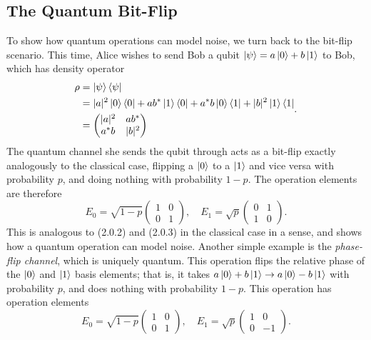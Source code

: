 \documentclass[12pt,a4paper]{report}
\numberwithin{equation}{section}
\newcommand{\ketbra}[2]{\ket{#1}\bra{#2}}
\newcommand{\ketbras}[1]{\ketbra{#1}{#1}}
\theoremstyle{definition}
\theoremstyle{theorem}
\theoremstyle{theorem}
\theoremstyle{example}
\theoremstyle{definition}
\begin{document}
\subsection{The Quantum Bit-Flip}
To show how quantum operations can model noise, we turn back to the bit-flip scenario. This time, Alice wishes to send Bob a qubit $\ket{\psi}=a\ket{0}+b\ket{1}$ to Bob, which has density operator
\begin{equation}
	\begin{aligned} 
		\rho&=\ketbras{\psi}\\&=|a|^{2}\ketbras{0}+ab^{*}\ketbra{1}{0}+a^{*}b\ketbra{0}{1}+|b|^{2}\ketbras{1}\\&=\begin{pmatrix}
			|a|^{2}&ab^{*}\\a^{*}b&|b|^{2}
		\end{pmatrix}
	\end{aligned}.
\end{equation}
The quantum channel she sends the qubit through acts as a bit-flip exactly analogously to the classical case, flipping a $\ket{0}$ to a $\ket{1}$ and vice versa with probability $p$, and doing nothing with probability $1-p$. The operation elements are therefore
\begin{equation}
	E_{0}=\sqrt{1-p}\begin{pmatrix}1&0\\0&1\end{pmatrix},\quad E_{1}=\sqrt{p}\begin{pmatrix}0&1\\1&0\end{pmatrix}.
\end{equation}
This is analogous to (2.0.2) and (2.0.3) in the classical case in a sense, and shows how a quantum operation can model noise. Another simple example is the \textit{phase-flip channel}, which is uniquely quantum. This operation flips the relative phase of the $\ket{0}$ and $\ket{1}$ basis elements; that is, it takes $a\ket{0}+b\ket{1}\to a\ket{0}-b\ket{1}$ with probability $p$, and does nothing with probability $1-p$. This operation has operation elements
\begin{equation}
	E_{0}=\sqrt{1-p}\begin{pmatrix}1&0\\0&1\end{pmatrix},\quad E_{1}=\sqrt{p}\begin{pmatrix}1&0\\0&-1\end{pmatrix}.
\end{equation}
\end{document}
